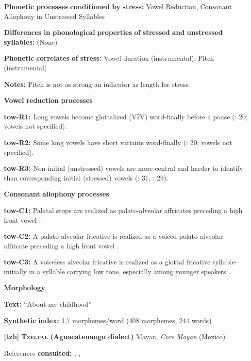 \begin{styleBody}
\textbf{Phonetic} \textbf{processes} \textbf{conditioned} \textbf{by} \textbf{stress:} Vowel Reduction, Consonant Allophony in Unstressed Syllables

\textbf{Differences} \textbf{in} \textbf{phonological} \textbf{properties} \textbf{of} \textbf{stressed} \textbf{and} \textbf{unstressed} \textbf{syllables:} (None)

\textbf{Phonetic} \textbf{correlates} \textbf{of} \textbf{stress:} Vowel duration (instrumental), Pitch (instrumental)

\textbf{Notes:} Pitch is not as strong an indicator as length for stress.

\textbf{Vowel} \textbf{reduction} \textbf{processes}

\textbf{tow-R1:} Long vowels become glottalized (VʔV) word-finally before a pause (\citealt{Yumitani1998}: 20; vowels not specified).

\textbf{tow-R2:} Some long vowels have short variants word-finally (\citealt{Yumitani1998}: 20; vowels not specified).

\textbf{tow-R3:} Non-initial (unstressed) vowels are more central and harder to identify than corresponding initial (stressed) vowels (\citealt{Yumitani1998}: 31, \citealt{Bell1993}: 29).

\textbf{Consonant} \textbf{allophony} \textbf{processes}

\textbf{tow-C1:} Palatal stops are realized as palato-alveolar affricates preceding a high front vowel \citep[13]{Yumitani1998}.

\textbf{tow-C2:} A palato-alveolar fricative is realized as a voiced palato-alveolar affricate preceding a high front vowel \citep[13]{Yumitani1998}.

\textbf{tow-C3:} A voiceless alveolar fricative is realized as a glottal fricative syllable-initially in a syllable carrying low tone, especially among younger speakers \citep[13]{Yumitani1998}.

\textbf{Morphology}

\textbf{Text:} “About my childhood” \citep[248-250]{Yumitani1998}

\textbf{Synthetic} \textbf{index:} 1.7 morphemes/word (408 morphemes, 244 words)

\textbf{[tzh]}   \textbf{\textsc{Tzeltal} \textbf{(Aguacatenango} \textbf{dialect)}}  Mayan, \textit{Core} \textit{Mayan} (Mexico)

References \textbf{consulted:} \citet{Kaufman1971}, \citet{Polian2006}, \citet{Smith2007}


\end{styleBody}
